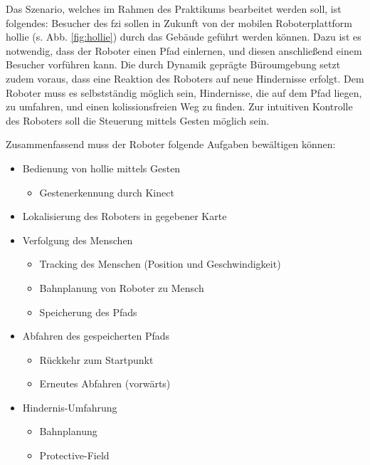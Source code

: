 Das Szenario, welches im Rahmen des Praktikums bearbeitet werden soll, ist folgendes:
Besucher des \gls{fzi} sollen in Zukunft von der mobilen Roboterplattform \gls{hollie} (s. Abb. \ref{fig:hollie}) durch das Gebäude geführt werden können.
Dazu ist es notwendig, dass der Roboter einen Pfad einlernen, und diesen anschließend einem Besucher vorführen kann.
Die durch Dynamik geprägte Büroumgebung setzt zudem voraus, dass eine Reaktion des Roboters auf neue Hindernisse erfolgt.
Dem Roboter muss es selbstständig möglich sein, Hindernisse, die auf dem Pfad liegen, zu umfahren, und einen kolissionsfreien Weg zu finden.
Zur intuitiven Kontrolle des Roboters soll die Steuerung mittels Gesten möglich sein.

Zusammenfassend muss der Roboter folgende Aufgaben bewältigen können:

\begin{itemize}
  \item Bedienung von \gls{hollie} mittels Gesten
	\begin{itemize}
	\item Gestenerkennung durch Kinect
	\end{itemize}
  \item Lokalisierung des Roboters in gegebener Karte
  \item Verfolgung des Menschen
	\begin{itemize}
	  \item Tracking des Menschen (Position und Geschwindigkeit)
	  \item Bahnplanung von Roboter zu Mensch
	  \item Speicherung des Pfads
	\end{itemize}
  \item Abfahren des gespeicherten Pfads
	\begin{itemize}
	  \item Rückkehr zum Startpunkt
	  \item Erneutes Abfahren (vorwärts)
	\end{itemize}
  \item Hindernis-Umfahrung
	\begin{itemize}
	  \item Bahnplanung
	  \item Protective-Field
	\end{itemize}
\end{itemize}

